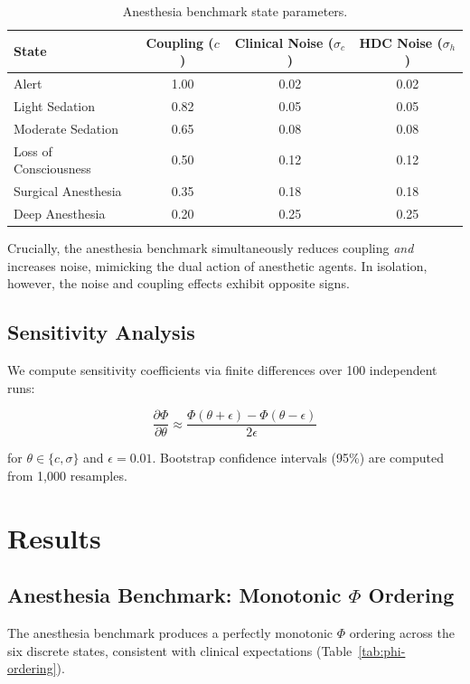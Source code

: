 \documentclass[12pt,a4paper]{article}
\begin{document}
\begin{table}[H]
\centering
\caption{Anesthesia benchmark state parameters.}
\label{tab:anesthesia-params}
\begin{tabular}{lccc}
\toprule
\textbf{State} & \textbf{Coupling ($c$)} & \textbf{Clinical Noise ($\sigma_c$)} & \textbf{HDC Noise ($\sigma_h$)} \\
\midrule
Alert & 1.00 & 0.02 & 0.02 \\
Light Sedation & 0.82 & 0.05 & 0.05 \\
Moderate Sedation & 0.65 & 0.08 & 0.08 \\
Loss of Consciousness & 0.50 & 0.12 & 0.12 \\
Surgical Anesthesia & 0.35 & 0.18 & 0.18 \\
Deep Anesthesia & 0.20 & 0.25 & 0.25 \\
\bottomrule
\end{tabular}
\end{table}

Crucially, the anesthesia benchmark simultaneously reduces coupling \emph{and} increases noise, mimicking the dual action of anesthetic agents. In isolation, however, the noise and coupling effects exhibit opposite signs.

\subsection{Sensitivity Analysis}

We compute sensitivity coefficients via finite differences over 100 independent runs:

\begin{equation}
\frac{\partial \Phi}{\partial \theta} \approx \frac{\Phi(\theta + \epsilon) - \Phi(\theta - \epsilon)}{2\epsilon}
\end{equation}

for $\theta \in \{c, \sigma\}$ and $\epsilon = 0.01$. Bootstrap confidence intervals (95\%) are computed from 1,000 resamples.

\section{Results}

\subsection{Anesthesia Benchmark: Monotonic $\Phi$ Ordering}

The anesthesia benchmark produces a perfectly monotonic $\Phi$ ordering across the six discrete states, consistent with clinical expectations (Table~\ref{tab:phi-ordering}).
\end{document}
